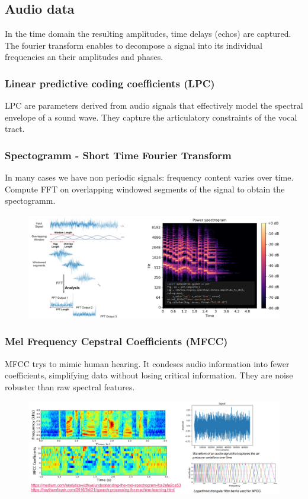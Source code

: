 \subsection{Audio data}
In the time domain the resulting amplitudes, time delays (echos) are captured.
The fourier transform enables to decompose a signal into its individual frequencies an their amplitudes and phases.
\subsubsection{Linear predictive coding coefficients (LPC)}
LPC are parameters derived from audio signals that effectively model the spectral envelope of a sound wave.
They capture the articulatory constraints of the vocal tract.
\subsubsection{Spectogramm - Short Time Fourier Transform}
In many cases we have non periodic signals: frequency content varies over time. Compute FFT on overlapping windowed segments of the signal to obtain the spectogramm.
\begin{figure}[!h]
    \includegraphics[width = \columnwidth]{figures/07/STFT.png}
\end{figure}
\subsubsection{Mel Frequency Cepstral Coefficients (MFCC)}
MFCC trys to mimic human hearing.
It condeses audio information into fewer coefficients, simplifying data without losing critical information.
They are noise robuster than raw spectral features.
\begin{figure}[!h]
    \includegraphics[width = \columnwidth]{figures/07/MFCC.png}
\end{figure}